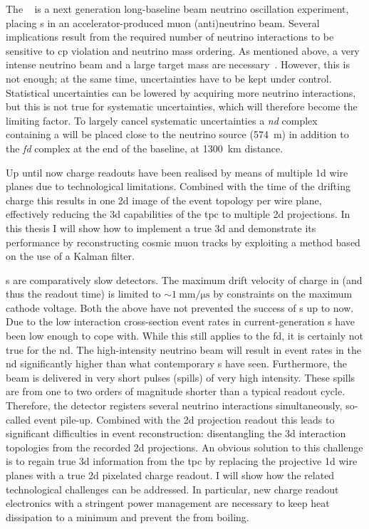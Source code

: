 The \dune{}~\cite{dune1, dune2, dune3, dune4} is a next generation long-baseline beam neutrino oscillation experiment, placing \lartpc{}s in an accelerator-produced muon (anti)neutrino beam.
Several implications result from the required number of neutrino interactions to be sensitive to \gls{cp} violation and neutrino mass ordering.
As mentioned above, a very intense neutrino beam and a large target mass are necessary~\cite{dune3, dune4}.
However, this is not enough; at the same time, uncertainties have to be kept under control.
Statistical uncertainties can be lowered by acquiring more neutrino interactions, but this is not true for systematic uncertainties, which will therefore become the limiting factor.
To largely cancel systematic uncertainties a \emph{\gls{nd}} complex containing a \lartpc{} will be placed close to the neutrino source (\SI{574}{\metre}) in addition to the \emph{\gls{fd}} complex at the end of the baseline, at \SI{1300}{\kilo\metre} distance.

Up until now \lartpc{} charge readouts have been realised by means of multiple \gls{1d} wire planes due to technological limitations.
Combined with the time of the drifting charge this results in one \gls{2d} image of the event topology per wire plane, effectively reducing the \gls{3d} capabilities of the \gls{tpc} to multiple \gls{2d} projections.
In this thesis I will show how to implement a true \gls{3d} \lartpc{} and demonstrate its performance by reconstructing cosmic muon tracks by exploiting a method based on the use of a Kalman filter.

\lartpc{}s are comparatively slow detectors.
The maximum drift velocity of charge in \lar{} (and thus the readout time) is limited to $\sim{\SI{1}{\milli\metre\per\micro\second}}$ by constraints on the maximum cathode voltage.
Both the above have not prevented the success of \lartpc{}s up to now.
Due to the low interaction cross-section event rates in current-generation \lartpc{}s have been low enough to cope with.
While this still applies to the \dune{} \gls{fd}, it is certainly not true for the \gls{nd}.
The high-intensity neutrino beam will result in event rates in the \gls{nd} significantly higher than what contemporary \lartpc{}s have seen.
Furthermore, the beam is delivered in very short pulses (spills) of very high intensity.
These spills are from one to two orders of magnitude shorter than a typical \lartpc{} readout cycle.
Therefore, the detector registers several neutrino interactions simultaneously, so-called event pile-up.
Combined with the \gls{2d} projection readout this leads to significant difficulties in event reconstruction: disentangling the \gls{3d} interaction topologies from the recorded \gls{2d} projections.
An obvious solution to this challenge is to regain true \gls{3d} information from the \gls{tpc} by replacing the projective \gls{1d} wire planes with a true \gls{2d} pixelated charge readout.
I will show how the related technological challenges can be addressed.
In particular, new charge readout electronics with a stringent power management are necessary to keep heat dissipation to a minimum and prevent the \lar{} from boiling.

